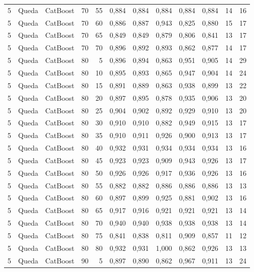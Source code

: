 \begin{longtable}{@{}rllrrrrrrrrr@{}}
5 & Queda & CatBoost & 70 & 55 & 0,884 & 0,884 & 0,884 & 0,884 & 0,884 & 14 & 16 \\
5 & Queda & CatBoost & 70 & 60 & 0,886 & 0,887 & 0,943 & 0,825 & 0,880 & 15 & 17 \\
5 & Queda & CatBoost & 70 & 65 & 0,849 & 0,849 & 0,879 & 0,806 & 0,841 & 13 & 17 \\
5 & Queda & CatBoost & 70 & 70 & 0,896 & 0,892 & 0,893 & 0,862 & 0,877 & 14 & 17 \\
5 & Queda & CatBoost & 80 & 5 & 0,896 & 0,894 & 0,863 & 0,951 & 0,905 & 14 & 29 \\
5 & Queda & CatBoost & 80 & 10 & 0,895 & 0,893 & 0,865 & 0,947 & 0,904 & 14 & 24 \\
5 & Queda & CatBoost & 80 & 15 & 0,891 & 0,889 & 0,863 & 0,938 & 0,899 & 13 & 22 \\
5 & Queda & CatBoost & 80 & 20 & 0,897 & 0,895 & 0,878 & 0,935 & 0,906 & 13 & 20 \\
5 & Queda & CatBoost & 80 & 25 & 0,904 & 0,902 & 0,892 & 0,929 & 0,910 & 13 & 20 \\
5 & Queda & CatBoost & 80 & 30 & 0,910 & 0,910 & 0,882 & 0,949 & 0,915 & 13 & 17 \\
5 & Queda & CatBoost & 80 & 35 & 0,910 & 0,911 & 0,926 & 0,900 & 0,913 & 13 & 17 \\
5 & Queda & CatBoost & 80 & 40 & 0,932 & 0,931 & 0,934 & 0,934 & 0,934 & 13 & 16 \\
5 & Queda & CatBoost & 80 & 45 & 0,923 & 0,923 & 0,909 & 0,943 & 0,926 & 13 & 17 \\
5 & Queda & CatBoost & 80 & 50 & 0,926 & 0,926 & 0,917 & 0,936 & 0,926 & 13 & 16 \\
5 & Queda & CatBoost & 80 & 55 & 0,882 & 0,882 & 0,886 & 0,886 & 0,886 & 13 & 13 \\
5 & Queda & CatBoost & 80 & 60 & 0,897 & 0,899 & 0,925 & 0,881 & 0,902 & 13 & 16 \\
5 & Queda & CatBoost & 80 & 65 & 0,917 & 0,916 & 0,921 & 0,921 & 0,921 & 13 & 14 \\
5 & Queda & CatBoost & 80 & 70 & 0,940 & 0,940 & 0,938 & 0,938 & 0,938 & 13 & 14 \\
5 & Queda & CatBoost & 80 & 75 & 0,841 & 0,838 & 0,811 & 0,909 & 0,857 & 11 & 12 \\
5 & Queda & CatBoost & 80 & 80 & 0,932 & 0,931 & 1,000 & 0,862 & 0,926 & 13 & 13 \\
5 & Queda & CatBoost & 90 & 5 & 0,897 & 0,890 & 0,862 & 0,967 & 0,911 & 13 & 24 \\

\end{longtable}
